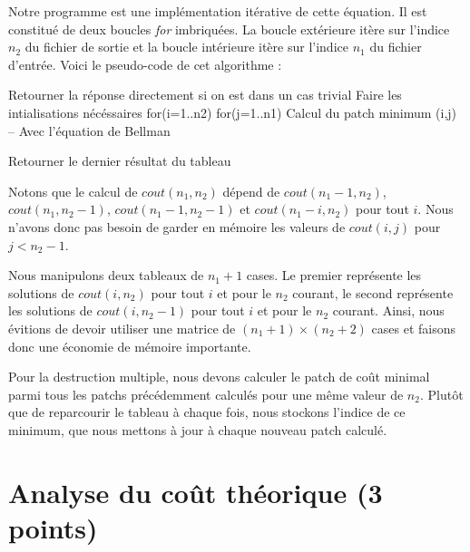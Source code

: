 \documentclass[a4paper, 10pt, french]{article}
\begin{document}
Notre programme est une implémentation itérative de cette équation. Il est constitué
de deux boucles \emph{for} imbriquées. La boucle extérieure itère sur l'indice $n_2$
du fichier de sortie et la boucle intérieure itère sur l'indice $n_1$ du fichier
d'entrée.
Voici le pseudo-code de cet algorithme :
\begin{verbatimtab}
	Retourner la réponse directement si on est dans un cas trivial
	Faire les intialisations nécéssaires
	for(i=1..n2)
	  for(j=1..n1)
		Calcul du patch minimum (i,j) -- Avec l'équation de Bellman
	
	Retourner le dernier résultat du tableau
\end{verbatimtab}
Notons que le calcul de $cout(n_1, n_2)$ dépend de $cout(n_1-1, n_2)$,
$cout(n_1, n_2-1)$, $cout(n_1-1, n_2-1)$ et $cout(n_1-i, n_2)$ pour tout $i$.
Nous n'avons donc pas besoin de garder en mémoire les valeurs de $cout(i, j)$ pour
$j < n_2-1$.

Nous manipulons deux tableaux de $n_1+1$ cases. Le premier représente les solutions
de $cout(i, n_2)$ pour tout $i$ et pour le $n_2$ courant, le second représente
les solutions de $cout(i, n_2-1)$ pour tout $i$ et pour le $n_2$ courant.
Ainsi, nous évitions de devoir utiliser une matrice de $(n_1+1)\times(n_2+2)$ cases
et faisons donc une économie de mémoire importante.

Pour la destruction multiple, nous devons calculer le patch de coût minimal parmi
tous les patchs précédemment calculés pour une même valeur de $n_2$.
Plutôt que de reparcourir le tableau à chaque fois, nous stockons l'indice de
ce minimum, que nous mettons à jour à chaque nouveau patch calculé.

\section{Analyse du coût théorique (3 points)}
\end{document}
